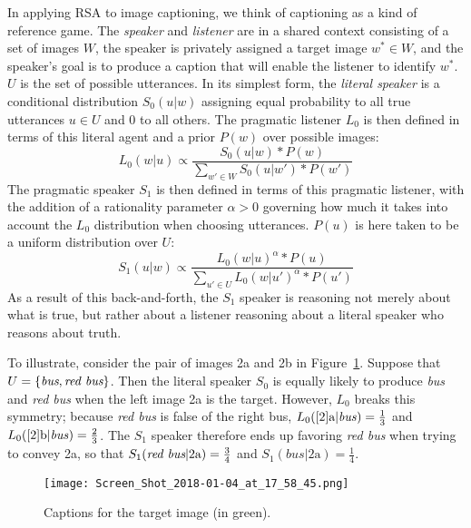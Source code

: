 \documentclass[11pt,a4paper]{article}
\begin{document}
In applying RSA to image captioning, we think of captioning as a
kind of reference game. The \emph{speaker} and \emph{listener} are in a shared
context consisting of a set of images $W$, the speaker is privately
assigned a target image $w^{\ast} \in W$, and the speaker's goal is to
produce a caption that will enable the listener to identify
$w^{\ast}$. $U$ is the set of possible utterances. In its simplest form, the \emph{literal speaker} is a
conditional distribution $S_{0}(u|w)$ assigning equal probability to all true utterances $u\in U$ and $0$ to all others. The pragmatic listener
$L_{0}$ is then defined in terms of this literal agent and a prior $P(w)$ over possible images:
\begin{equation}
L_{0}(w|u) \propto \frac{S_{0}(u|w)*P(w)}{\sum_{w'\in W}S_{0}(u|w')*P(w')}
\end{equation}
The pragmatic speaker $S_{1}$ is then defined in terms of this pragmatic listener, with the addition of a rationality parameter
$\alpha > 0$ governing how much it takes into account the $L_{0}$ 
distribution when choosing utterances. $P(u)$ is here taken to be a uniform distribution over $U$:
\begin{equation}
S_{1}(u|w) \propto \frac{L_{0}(w|u)^{\alpha}*P(u)}{\sum_{u'\in U}L_{0}(w|u')^{\alpha}*P(u')}
\end{equation}
As a result of this back-and-forth, the $S_{1}$ speaker is reasoning not merely about what is true, but rather about a listener reasoning about a literal speaker who reasons about truth.

To illustrate, consider the pair of images 2a and 2b in Figure~\ref{2}. Suppose that $U =\{\emph{bus}, \emph{red bus}\}$. Then the literal speaker $S_{0}$ is equally likely to produce \emph{bus} and \emph{red bus} when the left image 2a is the target. However, $L_{0}$ breaks this symmetry; because \emph{red bus} is false of the right bus, $L_0(\ref{2}\textrm{a}|\mathit{bus}) = \frac{1}{3}$ and $L_0(\ref{2}\textrm{b}|\mathit{bus}) = \frac{2}{3}$. The $S_{1}$ speaker therefore ends up favoring \emph{red bus} when trying to convey 2a, so that $S_1(\emph{red bus}|2\textrm{a}) = \frac{3}{4}$ and $S_1(\mathit{bus}|2\textrm{a}) = \frac{1}{4}$.

\begin{figure}

\texttt{[image: Screen\_Shot\_2018-01-04\_at\_17\_58\_45.png]}
\caption{Captions for the target image (in green).}
\label{2}
\end{figure}
\end{document}
